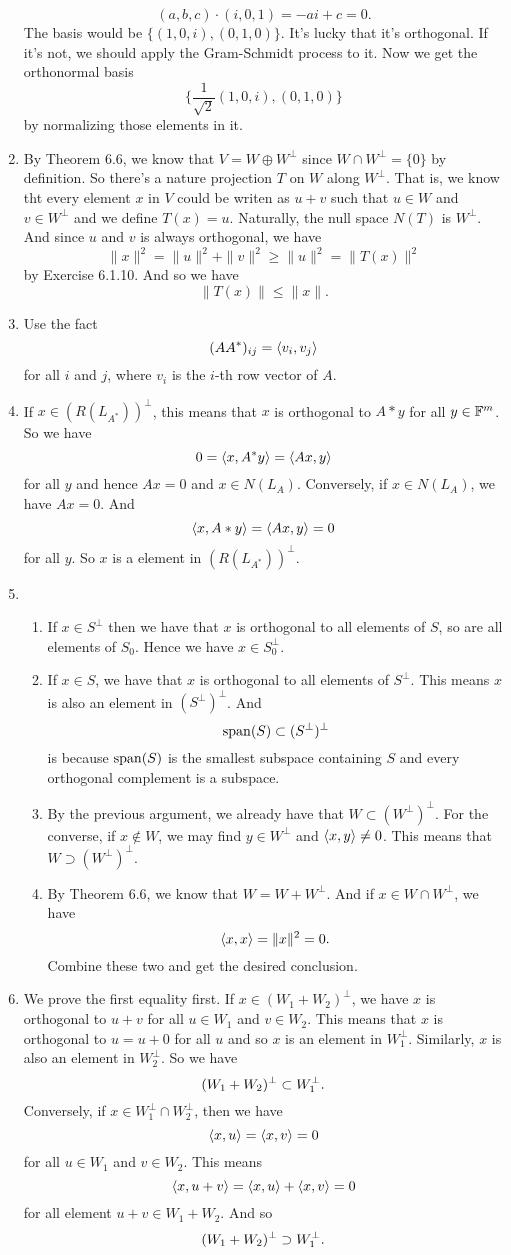 \begin{enumerate}
\[(a,b,c)\cdot (i,0,1)=-ai+c=0.\]
The basis would be $\{(1,0,i),(0,1,0)\}$. It's lucky that it's orthogonal. If it's not, we should apply the Gram-Schmidt process to it. Now we get the orthonormal basis 
\[\{\frac{1}{\sqrt{2}}(1,0,i),(0,1,0)\}\]
by normalizing those elements in it.
\item By Theorem 6.6, we know that $V=W\oplus W^{\perp}$ since $W\cap W^{\perp}=\{0\}$ by definition. So there's a nature projection $T$ on $W$ along $W^{\perp}$. That is, we know tht every element $x$ in $V$ could be writen as $u+v$ such that $u\in W$ and $v\in W^{\perp}$ and we define $T(x)=u$. Naturally, the null space $N(T)$ is $W^{\perp}$. And since $u$ and $v$ is always orthogonal, we have 
\[\|x\|^2=\|u\|^2+\|v\|^2\geq \|u\|^2=\|T(x)\|^2\]
by Exercise 6.1.10. And so we have 
\[\|T(x)\|\leq \|x\|.\]
\item Use the fact 
\[(AA^*)_{ij}=\lag v_i,v_j\rag \]
for all $i$ and $j$, where $v_i$ is the $i$-th row vector of $A$.
\item If $x\in (R(L_{A^*}))^{\perp}$, this means that $x$ is orthogonal to $A*y$ for all $y\in \F^m$. So we have 
\[0=\lag x,A^*y\rag =\lag Ax,y\rag \]
for all $y$ and hence $Ax=0$ and $x\in N(L_A)$. Conversely, if $x\in N(L_A)$, we have $Ax=0$. And 
\[\lag x,A*y\rag =\lag Ax,y\rag =0\]
for all $y$. So $x$ is a element in $(R(L_{A^*}))^{\perp}$.
\item \begin{enumerate}
\item If $x\in S^{\perp}$ then we have that $x$ is orthogonal to all elements of $S$, so are all elements of $S_0$. Hence we have $x\in S_0^{\perp}$.
\item If $x\in S$, we have that $x$ is orthogonal to all elements of $S^{\perp}$. This means $x$ is also an element in $(S^{\perp})^{\perp}$. And 
\[\sp(S)\subset (S^{\perp})^{\perp}\]
is because $\sp(S)$ is the smallest subspace containing $S$ and every orthogonal complement is a subspace.
\item By the previous argument, we already have that $W\subset (W^{\perp})^{\perp}$. For the converse, if $x\notin W$, we may find $y\in W^{\perp}$ and $\lag x,y\rag \neq 0$. This means that $W\supset (W^{\perp})^{\perp}$.
\item By Theorem 6.6, we know that $W=W+W^{\perp}$. And if $x\in W\cap W^{\perp}$, we have 
\[\lag x,x\rag =\|x\|^2=0.\]
Combine these two and get the desired conclusion.
\end{enumerate}
\item We prove the first equality first.  If $x\in (W_1+W_2)^{\perp}$, we have $x$ is orthogonal to $u+v$ for all $u\in W_1$ and $v\in W_2$. This means that $x$ is orthogonal to $u=u+0$ for all $u$ and so $x$ is an element in $W_1^{\perp}$. Similarly, $x$ is also an element in $W_2^{\perp}$. So we have 
\[(W_1+W_2)^{\perp}\subset W_1\pp .\]
Conversely, if $x\in W_1^{\perp}\cap W_2^{\perp}$, then we have 
\[\lag x,u\rag =\lag x,v\rag =0\]
for all $u\in W_1$ and $v\in W_2$. This means 
\[\lag x,u+v\rag =\lag x,u\rag +\lag x,v\rag =0\]
for all element $u+v\in W_1+W_2$. And so 
\[(W_1+W_2)^{\perp}\supset W_1\pp .\]


\end{enumerate}
